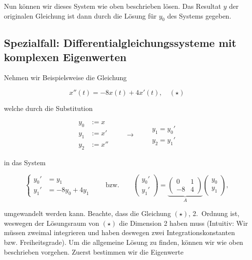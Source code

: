 Nun können wir dieses System wie oben beschrieben lösen. Das Resultat \( y \) der originalen Gleichung ist dann durch die Lösung für \( y_0 \) des Systems gegeben. 

\subsection{Spezialfall: Differentialgleichungssysteme mit komplexen Eigenwerten}

Nehmen wir Beispielsweise die Gleichung 

\begin{equation*}
    x''(t) = -8x(t) + 4x'(t), \quad (\star)
    \label{eq:lin_diff}
\end{equation*}

welche durch die Substitution

\begin{equation*}
    \begin{aligned}
        y_0 &:= x \\
        y_1 &:= x' \\
        y_2 &:= x''         
    \end{aligned} \qquad \longrightarrow \qquad
    \begin{aligned}
        y_1 = y_0' \\
        y_2 = y_1' 
    \end{aligned}
\end{equation*}

in das System 

\begin{equation*}
    \left\{ \begin{aligned}
        y_0' &= y_1 \\
        y_1' &= -8y_0 + 4y_1
    \end{aligned} \right. \qquad \text{bzw.} \qquad
    \begin{pmatrix}
        y_0' \\
        y_1'
    \end{pmatrix} =
    \underbrace{\begin{pmatrix}
        0 & 1 \\
        -8 & 4
    \end{pmatrix}}_{A}
    \begin{pmatrix}
        y_0 \\
        y_1
    \end{pmatrix},
\end{equation*}

umgewandelt werden kann. Beachte, dass die Gleichung \((\star)\), 2.\ Ordnung ist, weswegen der Lösungsraum von \((\star)\) die Dimension 2 haben muss (Intuitiv: Wir müssen zweimal integrieren und haben deswegen zwei Integrationskonstanten bzw. Freiheitsgrade). Um die allgemeine Lösung zu finden, können wir wie oben beschrieben vorgehen. Zuerst bestimmen wir die Eigenwerte

